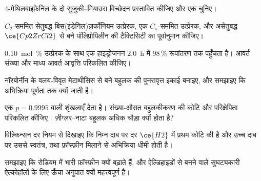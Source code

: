 \begin{exercise}[$\star\star$]\label{exo:b3:homogeneous-catalysis:6}
4-मेथिलबाइफ़ेनिल के दो सुज़ुकी--मियाउरा विच्छेदन प्रस्तावित कीजिए और एक चुनिए।
\end{exercise}

\begin{exercise}[$\star\star$]\label{exo:b3:homogeneous-catalysis:7}
$C_2$-सममित सेतुबद्ध
बिस(इंडेनिल)ज़र्कोनियम उत्प्रेरक, एक $C_s$-सममित उत्प्रेरक, और असेतुबद्ध $\ce{Cp2ZrCl2}$ से बने पॉलिप्रोपिलीन की टैक्टिसिटी का पूर्वानुमान कीजिए।
\end{exercise}

\begin{exercise}[$\star\star$]\label{exo:b3:homogeneous-catalysis:8}
\qty{0.10}{mol\%} उत्प्रेरक के साथ एक हाइड्रोजनन \qty{2.0}{h} में 98\,\% रूपांतरण तक पहुँचता है।
आवर्त संख्या और माध्य आवर्त आवृत्ति परिकलित कीजिए।
\end{exercise}

\begin{exercise}[$\star\star$]\label{exo:b3:homogeneous-catalysis:9}
नॉरबोर्नीन के वलय-विवृत मेटाथीसिस से बने बहुलक की पुनरावृत्त इकाई बनाइए,
और समझाइए कि अभिक्रिया पूर्णता तक क्यों जाती है।
\end{exercise}

\begin{exercise}[$\star\star\star$]\label{exo:b3:homogeneous-catalysis:10}
एक  $p = 0.9995$ वाली शृंखलाएँ देता है। संख्या-औसत
बहुलकीकरण की कोटि और परिक्षेपिता परिकलित कीजिए। ज़ीग्लर--नाटा बहुलक
अधिक चौड़ा क्यों होता है?
\end{exercise}

\begin{exercise}[$\star\star\star$]\label{exo:b3:homogeneous-catalysis:11}
विल्किन्सन दर नियम से दिखाइए कि निम्न दाब पर दर $\ce{H2}$ में प्रथम कोटि की है
और उच्च दाब पर उससे स्वतंत्र, तथा फ़ॉस्फ़ीन मिलाने से
अभिक्रिया धीमी होती है।
\end{exercise}

\begin{exercise}[$\star\star\star$]\label{exo:b3:homogeneous-catalysis:12}
समझाइए कि रोडियम  में भारी फ़ॉस्फ़ीन  क्यों बढ़ाते हैं,
और ऐल्डिहाइडों से बनने वाले सुघट्यकारी ऐल्कोहॉलों के लिए ऊँचा अनुपात
क्यों महत्त्वपूर्ण है।
\end{exercise}

